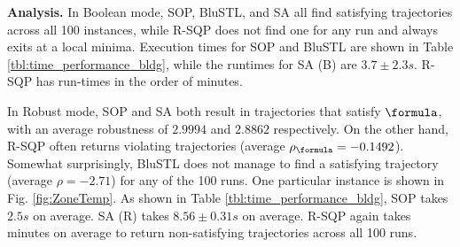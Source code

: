 \textbf{Analysis.} 
In Boolean mode, SOP, BluSTL, and SA all find satisfying trajectories across all 100 instances, while R-SQP does not find one for any run and always exits at a local minima. 
Execution times for SOP and BluSTL are shown in Table \ref{tbl:time_performance_bldg}, while the runtimes for SA (B) are $3.7 \pm 2.3s$.
 R-SQP has run-times in the order of minutes. 
 
In Robust mode, SOP and SA both result in trajectories that satisfy $\formula$, with an average robustness of $2.9994$ and $2.8862$ respectively. On the other hand, R-SQP often returns violating trajectories (average $\rob_{\formula} = -0.1492$). 
Somewhat surprisingly, BluSTL does not manage to find a satisfying trajectory (average $\rho=-2.71$) for any of the 100 runs. 
One particular instance is shown in Fig. \ref{fig:ZoneTemp}. 
As shown in Table \ref{tbl:time_performance_bldg}, SOP takes $2.5s$ on average.
SA (R) takes $8.56 \pm 0.31s$ on average. 
R-SQP again takes minutes on average to return non-satisfying trajectories across all 100 runs. 



